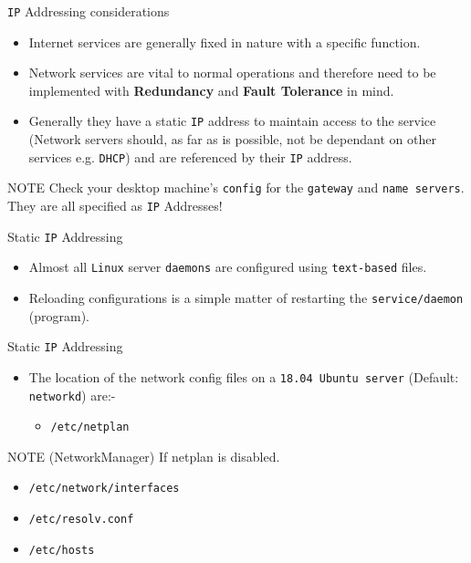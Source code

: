 \documentclass[aspectratio=169]{beamer}
\begin{document}
\begin{frame}{\texttt{IP} Addressing considerations}
   \begin{itemize}
     \item Internet services are generally fixed in nature with a specific function. 
     \item Network services are vital to normal operations and therefore need to be implemented with \textbf{Redundancy} and \textbf{Fault Tolerance} in mind.
     \item Generally they have a static \texttt{IP} address to maintain access to the service (Network servers should, as far as is possible, not be dependant on other services e.g. \texttt{DHCP}) and are referenced by their \texttt{IP} address.
   \end{itemize}
   \begin{block}{NOTE}
     Check your desktop machine's \texttt{config} for the \texttt{gateway} and \texttt{name servers}. They are  all specified as \texttt{IP} Addresses!
   \end{block}
\end{frame}

\begin{frame}{Static \texttt{IP} Addressing}
  \begin{itemize}
    \item Almost all \texttt{Linux} server \texttt{daemons} are configured using \texttt{text-based} files.
    \item Reloading configurations is a simple matter of restarting the \texttt{service/daemon} (program).
  \end{itemize}
\end{frame}

\begin{frame}{Static \texttt{IP} Addressing}
  \begin{itemize}
    \item The location of the network config files on a \texttt{18.04 Ubuntu server} (Default: \texttt{networkd}) are:-
    \begin{itemize}
      \item \texttt{/etc/netplan}
    \end{itemize} 
  \end{itemize}
  \begin{block}{NOTE (NetworkManager)}
    If netplan is disabled.
    \begin{itemize}
      \item \texttt{/etc/network/interfaces}
      \item \texttt{/etc/resolv.conf}
      \item \texttt{/etc/hosts}
    \end{itemize} 
  \end{block}
\end{frame}
\end{document}
